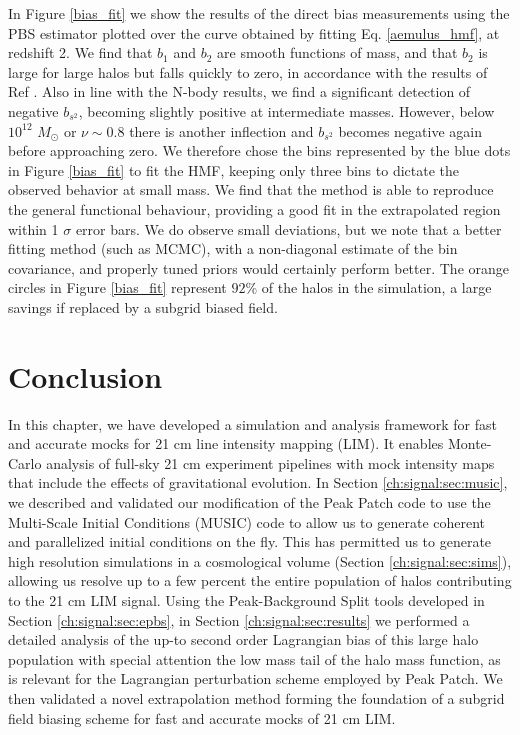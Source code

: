 In Figure \ref{bias_fit} we show the results of the direct bias measurements using the PBS estimator plotted over the curve obtained by fitting Eq. \ref{aemulus_hmf}, at redshift 2. We find that $b_1$ and $b_2$ are smooth functions of mass, and that $b_2$ is large for large halos but falls quickly to zero, in accordance with the results of Ref \citep{modietal2017}. Also in line with the N-body results, we find a significant detection of negative $b_{s^2}$, becoming slightly positive at intermediate masses. However, below $10^{12}$ $M_\odot$ or $\nu \sim 0.8$ there is another inflection and $b_{s^2}$ becomes negative again before approaching zero. We therefore chose the bins represented by the blue dots in Figure \ref{bias_fit} to fit the HMF, keeping only three bins to dictate the observed behavior at small mass. We find that the method is able to reproduce the general functional behaviour, providing a good fit in the extrapolated region within 1 $\sigma$ error bars. We do observe small deviations, but we note that a better fitting method (such as MCMC), with a non-diagonal estimate of the bin covariance, and properly tuned priors would certainly perform better. The orange circles in Figure \ref{bias_fit} represent $92\%$ of the halos in the simulation, a large savings if replaced by a subgrid biased field.

\section{Conclusion}
\label{ch:signal:sec:conclusion}

In this chapter, we have developed a simulation and analysis framework for fast and accurate mocks for 21 cm line intensity mapping (LIM). It enables Monte-Carlo analysis of full-sky 21 cm experiment pipelines with mock intensity maps that include the effects of gravitational evolution. In Section \ref{ch:signal:sec:music}, we described  and validated our modification of the Peak Patch code to use the Multi-Scale Initial Conditions (MUSIC) code \citep{music} to allow us to generate coherent and parallelized initial conditions on the fly. This has permitted us to generate high resolution simulations in a cosmological volume (Section \ref{ch:signal:sec:sims}), allowing us resolve up to a few percent the entire population of halos contributing to the 21 cm LIM signal. Using the Peak-Background Split tools developed in Section \ref{ch:signal:sec:epbs}, in Section \ref{ch:signal:sec:results} we performed a detailed analysis of the up-to second order Lagrangian bias of this large halo population with special attention the low mass tail of the halo mass function, as is relevant for the Lagrangian perturbation scheme employed by Peak Patch. We then validated a novel extrapolation method forming the foundation of a subgrid field biasing scheme for fast and accurate mocks of 21 cm LIM.

